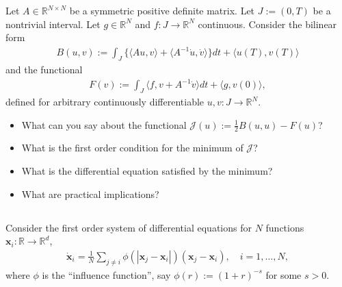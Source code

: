 \documentclass[12pt,a4paper]{article}
\newcommand{\from}{\colon}
\begin{document}
    Let $A \in \mathbb{R}^{N \times N}$ be a symmetric positive definite matrix.
    Let $J := (0, T)$ be a nontrivial interval.
    Let $g \in \mathbb{R}^N$ and $f \from J \to \mathbb{R}^N$ continuous.
    Consider the bilinear form
    \begin{align}
        B(u, v) :=
        \int_J \{
            \langle A u, v \rangle
            +
            \langle A^{-1} \dot{u}, \dot{v} \rangle
        \} dt
        +
        \langle u(T), v(T) \rangle
    \end{align}
    and the functional
    \begin{align}
        F(v) :=
        \int_J 
            \langle f, v + A^{-1} \dot{v} \rangle
        dt
        +
        \langle g, v(0) \rangle
        ,
    \end{align}
    defined for
    arbitrary continuously
    differentiable 
    $u, v \from J \to \mathbb{R}^N$.
    
    \begin{itemize}
    \item
        What can you say about the functional
        $
            \mathcal{J}(u) :=
            \frac12 B(u, u) - F(u)
        $?
    \item
        What is the first order condition for the minimum of $\mathcal{J}$?
    \item
        What is the differential equation satisfied by the minimum?
    \item
        What are practical implications?
    \end{itemize}

    

    
    \subsection{}
    
    Consider the first order system of differential equations
    for $N$ functions $\mathbf{x}_i \from \mathbb{R} \to \mathbb{R}^d$,
    \begin{align}
        \dot{\mathbf{x}}_i
        =
        \frac{1}{N} 
        \sum_{j \neq i}
        \phi(|\mathbf{x}_j - \mathbf{x}_i|)
        ( \mathbf{x}_j - \mathbf{x}_i )
        ,
        \quad
        i = 1, \ldots, N
        ,
    \end{align}
    where $\phi$ is the ``influence function'',
    say $\phi(r) := (1 + r)^{-s}$ for some $s > 0$.
    
\end{document}
